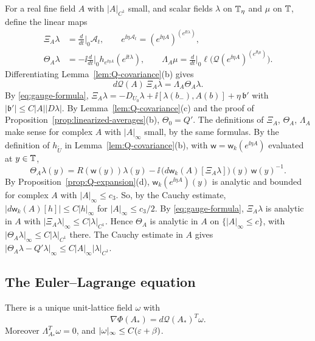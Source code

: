 For a real fine field $A$ with $|A|_{C^1}$ small, and scalar fields $\lambda$ on $\mathbb T_\eta$ and $\mu$ on $\mathbb T$, define the linear maps
\[
\begin{aligned}
\Xi_A\lambda&=\tfrac{d}{dt}\Big|_{0}\mathcal A_t,\qquad e^{\ii\eta\mathcal A_t}=(e^{\ii\eta A})^{(e^{\ii t\lambda})},\\
\Theta_A\lambda&=-\ii\tfrac{d}{dt}\Big|_{0}h_{e^{\ii\eta A}}(e^{\ii t\lambda}),\qquad
\Lambda_A\mu=\tfrac{d}{dt}\Big|_0\ell\big(\mathcal Q(e^{\ii\eta A})^{(e^{\ii t\mu})}\big).
\end{aligned}
\]
Differentiating Lemma~\ref{lem:Q-covariance}(b) gives
\begin{equation}\label{eq:dQ-gauge}
d\mathcal Q(A)\,\Xi_A\lambda=\Lambda_A\Theta_A\lambda .
\end{equation}
By \eqref{eq:gauge-formula}, $\Xi_A\lambda=-D_{U_0}\lambda+\ii[\lambda(b_-),A(b)]+\eta\,\mathfrak b'$ with $|\mathfrak b'|\le C|A||D\lambda|$. By Lemma~\ref{lem:Q-covariance}(c) and the proof of Proposition~\ref{prop:linearized-averages}(b), $\Theta_0=Q'$. The definitions of $\Xi_A$, $\Theta_A$, $\Lambda_A$ make sense for complex $A$ with $|A|_\infty$ small, by the same formulas. By the definition of $h_{\tilde U}$ in Lemma~\ref{lem:Q-covariance}(b), with $\mathsf w=\mathsf w_k(e^{\ii\eta A})$ evaluated at $y\in\mathbb T$,
\[
\Theta_A\lambda(y)=R(\mathsf w(y))\lambda(y)-\ii\,\big(d\mathsf w_k(A)[\Xi_A\lambda]\big)(y)\,\mathsf w(y)^{-1}.
\]
By Proposition~\ref{prop:Q-expansion}(d), $\mathsf w_k(e^{\ii\eta A})(y)$ is analytic and bounded for complex $A$ with $|A|_\infty\le c_3$. So, by the Cauchy estimate, $|d\mathsf w_k(A)[h]|\le C|h|_\infty$ for $|A|_\infty\le c_3/2$. By \eqref{eq:gauge-formula}, $\Xi_A\lambda$ is analytic in $A$ with $|\Xi_A\lambda|_\infty\le C|\lambda|_{C^1}$. Hence $\Theta_A$ is analytic in $A$ on $\{|A|_\infty\le c\}$, with $|\Theta_A\lambda|_\infty\le C|\lambda|_{C^1}$ there. The Cauchy estimate in $A$ gives $|\Theta_A\lambda-Q'\lambda|_\infty\le C|A|_\infty|\lambda|_{C^1}$.

\subsection{The Euler--Lagrange equation}

\begin{proposition}\label{prop:euler-lagrange}
There is a unique unit-lattice field $\omega$ with
\[
\nabla\Phi(A_*)=d\mathcal Q(A_*)^T\omega .
\]
Moreover $\Lambda_{A_*}^T\omega=0$, and $|\omega|_\infty\le C(\varepsilon+\beta)$.
\end{proposition}

